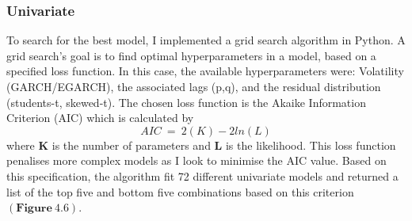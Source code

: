 \subsubsection{Univariate}
To search for the best model, I implemented a grid search algorithm in Python. A grid search's goal is to find optimal hyperparameters in a model, based on a specified loss function. In this case, the available hyperparameters were: Volatility (GARCH/EGARCH), the associated lags (p,q), and the residual distribution (students-t, skewed-t). The chosen loss function is the Akaike Information Criterion (AIC) which is calculated by $$ AIC~=~2(K) - 2ln(L)$$ where $\mathbf{K}$ is the number of parameters and $\mathbf{L}$ is the likelihood. This loss function penalises more complex models as I look to minimise the AIC value. Based on this specification, the algorithm fit 72 different univariate models and returned a list of the top five and bottom five combinations based on this criterion $\mathbf{(Figure~4.6)}$.
